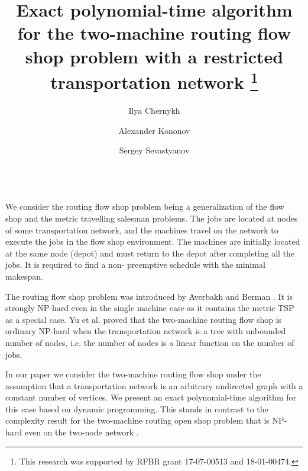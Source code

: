 \documentclass{llncs}
\begin{document}
\mainmatter              %
%
\title{Exact polynomial-time algorithm for the two-machine routing flow shop problem with a restricted transportation network
\thanks{This research was supported by RFBR grant 17-07-00513 and 18-01-00474.} }
%
%
\author{Ilya Chernykh \and
Alexander Kononov \and
Sergey Sevastyanov} 
%
%
%

\maketitle              %

\\

We consider the routing flow shop problem being a generalization of the flow shop and the metric travelling salesman problems.
The jobs are located at nodes of some transportation network, and the machines travel on the network to execute the jobs in the flow shop environment. 
The machines are initially located at the same node (depot) and must return to the depot after completing all the jobs. 
It is required to find a non- preemptive schedule with the minimal makespan.

The routing flow shop problem was introduced by Averbakh and Berman \cite{AverbakhBerman}. 
It is strongly NP-hard even in the single machine case as it contains the metric TSP as a special case.
Yu et al. \cite{Yu} proved that the two-machine routing flow shop is ordinary NP-hard when the transportation network is a tree
with unbounded number of nodes, i.e. the number of nodes is a linear function on the number of jobs.

In our paper we consider the two-machine routing flow shop under the assumption that a transportation network is an arbitrary undirected graph with a constant number of vertices. 
We present an exact polynomial-time algorithm for this case based on dynamic programming. 
This stands in contrast to the complexity result for the two-machine routing open shop problem
that is NP-hard even on the two-node network \cite{ABC}.
\end{document}
